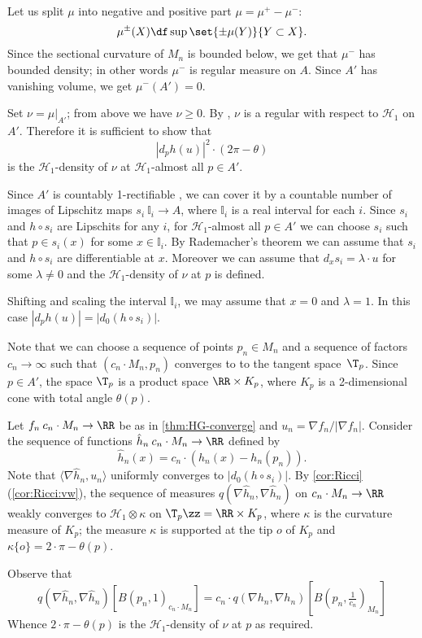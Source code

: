Let us split $\mu$ into negative and positive part $\mu=\mu^+-\mu^-$:
\[\mu^\pm(X)\df\sup\set{\pm\mu(Y)}{Y\subset X}.\]
Since the sectional curvature of $M_n$ is bounded below, we get that $\mu^-$ has bounded density; in other words $\mu^-$ is regular measure on $A$.
Since $A'$ has vanishing volume, we get $\mu^-(A')=0$.

Set $\nu=\mu|_{A'}$; from above we have $\nu\ge 0$.
By \cite{petrunin-SC}, $\nu$ is a regular with respect to $\mathcal{H}_1$ on $A'$.
Therefore it is sufficient to show that 
\[|d_ph(u)|^2\cdot (2\pi-\theta)\]
is the $\mathcal{H}_1$-density of $\nu$
at $\mathcal{H}_1$-almost all $p\in A'$.

Since $A'$ is countably 1-rectifiable \cite{li-naber}, we can cover it by a countable number of images of Lipschitz maps $s_i\:\mathbb{I}_i\to A$, where $\mathbb{I}_i$ is a real interval for each $i$.
Since $s_i$ and $h\circ s_i$ are Lipschits for any $i$, for $\mathcal{H}_1$-almost all $p\in A'$ we can choose $s_i$ such that $p\in s_i(x)$ for some $x\in \mathbb{I}_i$.
By Rademacher's theorem we can assume that $s_i$ and $h\circ s_i$ are differentiable at $x$.
Moreover we can assume that $d_xs_i=\lambda\cdot u$ for some $\lambda\ne 0$ and the $\mathcal{H}_1$-density of $\nu$ at $p$ is defined.

Shifting and scaling the interval $\mathbb{I}_i$, we may assume that $x=0$ and $\lambda=1$.
In this case $|d_ph(u)|=|d_0(h\circ s_i)|$.

Note that we can choose a sequence of points $p_n\in M_n$ and a sequence of factors $c_n\to \infty$ such that $(c_n\cdot M_n,p_n)$ converges to to the tangent space~$\T_p$.
Since $p\in A'$, the space $\T_p$ is a product space $\RR\times K_p$, where $K_p$ is a 2-dimensional cone with total angle $\theta(p)$.

Let $f_n\:c_n\cdot M_n\to \RR$ be as in \ref{thm:HG-converge} and $u_n=\nabla f_n/|\nabla f_n|$.
Consider the sequence of functions $\hat h_n\:c_n\cdot M_n\to \RR$ defined by 
\[\hat h_n(x)=c_n\cdot(h_n(x)-h_n(p_n)).\]
Note that $\langle\nabla \hat h_n,u_n\rangle$ uniformly converges to  $|d_0(h\circ s_i)|$.
By \ref{cor:Ricci}(\ref{cor:Ricci:vw}), the sequence of measures $q(\nabla\hat h_n, \nabla\hat h_n)$ on $c_n\cdot M_n\to \RR$ weakly converges to $\mathcal{H}_1\otimes\kappa $ on $\T_p\zz=\RR\times K_p$, 
where $\kappa$ is the curvature measure of $K_p$; 
the measure $\kappa$ is supported at the tip $o$ of $K_p$
and $\kappa\{o\}=2\cdot \pi-\theta(p)$.

Observe that 
\[q(\nabla\hat h_n, \nabla\hat h_n)[B(p_n,1)_{c_n\cdot M_n}]
=
c_n\cdot q(\nabla h_n, \nabla h_n)[B(p_n,\tfrac1{c_n})_{M_n}]\]
Whence $2\cdot \pi-\theta(p)$ is the $\mathcal{H}_1$-density of $\nu$ at $p$ as required.
\qeds
